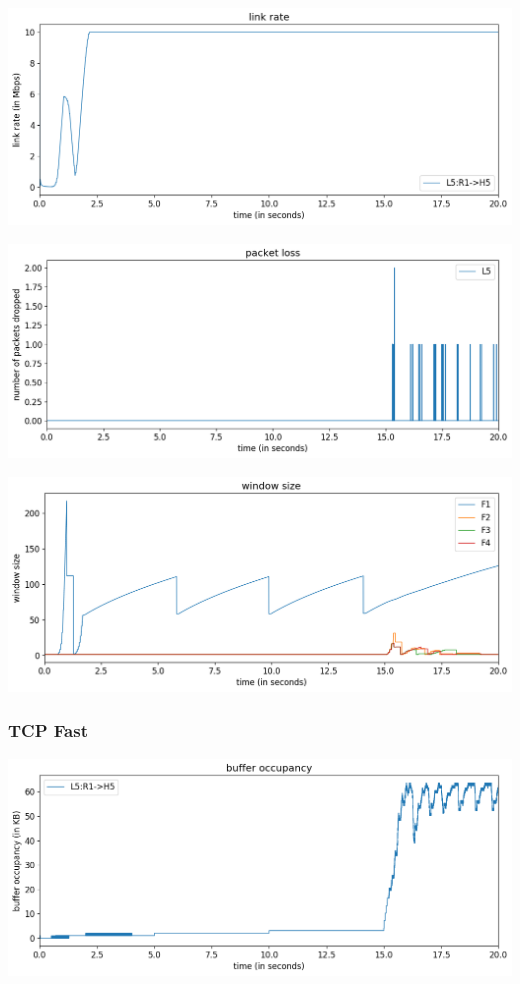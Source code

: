 \documentclass{article}
\begin{document}
\includegraphics[width = \textwidth]{"test_case5_reno link rate"}

\includegraphics[width = \textwidth]{"test_case5_reno packet loss"}

\includegraphics[width = \textwidth]{"test_case5_reno window size"}



\subsubsection{TCP Fast}

\includegraphics[width = \textwidth]{"test_case5_fast buffer occupancy"}
\end{document}
